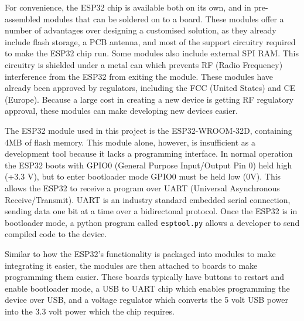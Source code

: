 \documentclass{article}
\begin{document}
For convenience, the ESP32 chip is available both on its own, and in pre-assembled modules that can be soldered on to a board. These modules offer a number of advantages over designing a customised solution, as they already include flash storage, a PCB antenna, and most of the support circuitry required to make the ESP32 chip run. Some modules also include external SPI RAM. This circuitry is shielded under a metal can which prevents RF (Radio Frequency) interference from the ESP32 from exiting the module. These modules have already been approved by regulators, including the FCC (United States) and CE (Europe). Because a large cost in creating a new device is getting RF regulatory approval, these modules can make developing new devices easier.

The ESP32 module used in this project is the
ESP32-WROOM-32D, containing 4MB of flash memory. This module alone, however, is insufficient as a development tool because it lacks a programming interface. In normal operation the ESP32 boots with GPIO0 (General Purpose Input/Output Pin 0) held high (+3.3 V), but to enter bootloader mode GPIO0 must be held low (0V). This allows the ESP32 to receive a program over UART (Universal Asynchronous Receive/Transmit). UART is an industry standard embedded serial connection, sending data one bit at a time over a bidirectonal protocol. Once the ESP32 is in bootloader mode, a python program called \texttt{esptool.py} allows a developer to send compiled code to the device.

Similar to how the ESP32's functionality is packaged into modules to make integrating it easier, the modules are then attached to boards to make programming them easier. These boards typically have buttons to restart and enable bootloader mode, a USB to UART chip which enables programming the device over USB, and a voltage regulator which converts the 5 volt USB power into the 3.3 volt power which the chip requires.
\end{document}
